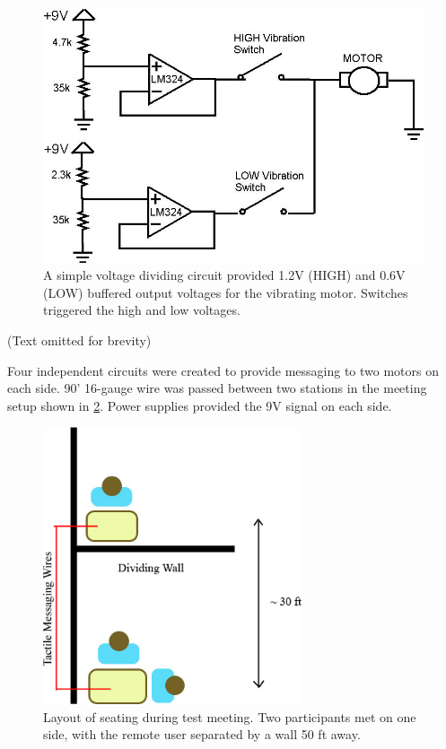 \begin{figure}[bhtp] 
	\begin{center}
		\includegraphics[width= \figwidth]{Figures/Ch5/tactile_circuit.jpg}
	\end{center}
	\caption[voltage divider]{A simple voltage dividing circuit provided 1.2V (HIGH) and 0.6V (LOW) buffered output voltages for the vibrating motor. Switches triggered the high and low voltages. }
	\label{fig:tactile_circuit}  
\end{figure}

\begin{center}
\color{blue}
(Text omitted for brevity)
\normalcolor
\end{center}

Four independent circuits were created to provide messaging to two motors on each side. 90' 16-gauge wire was passed between two stations in the meeting setup shown in \ref{fig:tactile_seating}. Power supplies provided the 9V signal on each side.

\begin{figure}[bhtp] 
	\begin{center}
		\includegraphics[width=3in]{Figures/Ch5/tactile_seating.jpg}
	\end{center}
	\caption[test meeting layout]{Layout of seating during test meeting. Two participants met on one side, with the remote user separated by a wall 50 ft away. }
	\label{fig:tactile_seating}  
\end{figure}

